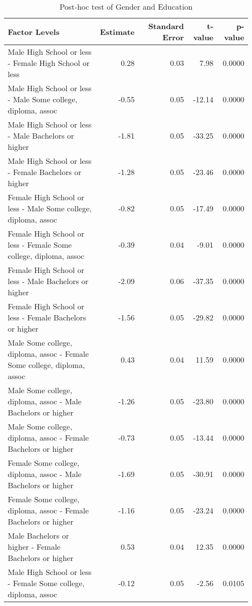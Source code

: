 \begin{table}[H]
\footnotesize
\centering
\caption{Post-hoc test of Gender and Education} 
\begin{tabular}{lrrrr}
  \hline
Factor Levels & Estimate & Standard Error & t-value & p-value \\ 
  \hline
  Male High School or less -  Female High School or less & 0.28 & 0.03 & 7.98 & 0.0000 \\ 
    Male High School or less -  Male Some college, diploma, assoc & -0.55 & 0.05 & -12.14 & 0.0000 \\ 
    Male High School or less -  Male Bachelors or higher & -1.81 & 0.05 & -33.25 & 0.0000 \\ 
    Male High School or less -  Female Bachelors or higher & -1.28 & 0.05 & -23.46 & 0.0000 \\ 
    Female High School or less -  Male Some college, diploma, assoc & -0.82 & 0.05 & -17.49 & 0.0000 \\ 
    Female High School or less -  Female Some college, diploma, assoc & -0.39 & 0.04 & -9.01 & 0.0000 \\ 
    Female High School or less -  Male Bachelors or higher & -2.09 & 0.06 & -37.35 & 0.0000 \\ 
    Female High School or less -  Female Bachelors or higher & -1.56 & 0.05 & -29.82 & 0.0000 \\ 
    Male Some college, diploma, assoc -  Female Some college, diploma, assoc & 0.43 & 0.04 & 11.59 & 0.0000 \\ 
    Male Some college, diploma, assoc -  Male Bachelors or higher & -1.26 & 0.05 & -23.80 & 0.0000 \\ 
    Male Some college, diploma, assoc -  Female Bachelors or higher & -0.73 & 0.05 & -13.44 & 0.0000 \\ 
    Female Some college, diploma, assoc -  Male Bachelors or higher & -1.69 & 0.05 & -30.91 & 0.0000 \\ 
    Female Some college, diploma, assoc -  Female Bachelors or higher & -1.16 & 0.05 & -23.24 & 0.0000 \\ 
    Male Bachelors or higher -  Female Bachelors or higher & 0.53 & 0.04 & 12.35 & 0.0000 \\ 
    Male High School or less -  Female Some college, diploma, assoc & -0.12 & 0.05 & -2.56 & 0.0105 \\ 
   \hline
\end{tabular}
\label{tab:gender_education}
\end{table}

